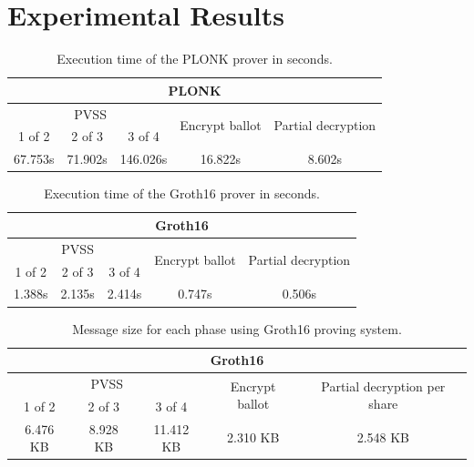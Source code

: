 \documentclass{article}
\begin{document}
\section{Experimental Results}

\begin{table}
\centering
\label{table:plonk-time}
\caption{Execution time of the PLONK prover in seconds.}
\begin{tabular}{|c|c|c|c|c|}
    \hline
    \multicolumn{5}{|c|}{PLONK} \\
    \hline
    \multicolumn{3}{|c|}{PVSS} & \multirow{2}{*}{Encrypt ballot} & \multirow{2}{*}{Partial decryption} \\
    \cline{1-3}
    1 of 2 & 2 of 3 & 3 of 4 & & \\
    \hline
    67.753s & 71.902s & 146.026s & 16.822s & 8.602s\\
    \hline
\end{tabular}
\end{table}

\begin{table}
\centering
\label{table:groth16-time}
\caption{Execution time of the Groth16 prover in seconds.}
\begin{tabular}{|c|c|c|c|c|}
    \hline
    \multicolumn{5}{|c|}{Groth16} \\
    \hline
    \multicolumn{3}{|c|}{PVSS} & \multirow{2}{*}{Encrypt ballot} & \multirow{2}{*}{Partial decryption} \\
    \cline{1-3}
    1 of 2 & 2 of 3 & 3 of 4 & & \\
    \hline
    1.388s & 2.135s & 2.414s & 0.747s & 0.506s\\
    \hline
\end{tabular}
\end{table}

\begin{table}
\centering
\label{table:groth16-size}
\caption{Message size for each phase using Groth16 proving system.}
\begin{tabular}{|c|c|c|c|c|}
    \hline
    \multicolumn{5}{|c|}{Groth16} \\
    \hline
    \multicolumn{3}{|c|}{PVSS} & \multirow{2}{*}{Encrypt ballot} & \multirow{2}{*}{Partial decryption per share} \\
    \cline{1-3}
    1 of 2 & 2 of 3 & 3 of 4 & & \\
    \hline
    6.476 KB& 8.928 KB & 11.412 KB & 2.310 KB & 2.548 KB\\
    \hline
\end{tabular}
\end{table}
\end{document}

